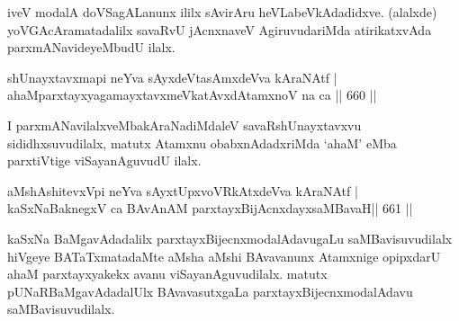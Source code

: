 \begin{artha}
iveV modalA doVSagALanunx ililx sAvirAru heVLabeVkAdadidxve. (alalxde) yoVGAcAramatadalilx savaRvU jAcnxnaveV AgiruvudariMda atirikatxvAda parxmANavideyeMbudU ilalx.
\end{artha}


\begin{shl}
shUnayxtavxmapi neYva sAyxdeVtasAmxdeVva kAraNAtf | \\
ahaMparxtayxyagamayxtavx\footnotemark[1]meVkatAvxdAtamxnoV na ca \hfill||  660 ||  
\end{shl}


\begin{artha}
I parxmANavilalxveMbakAraNadiMdaleV savaRshUnayxtavxvu sididhxsuvudilalx, matutx Atamxnu obabxnAdadxriMda `ahaM' eMba parxtiVtige viSayanAguvudU ilalx.
\end{artha}

\begin{shl}
aMshAshitevxV\s pi neYva sAyxtUpxvoVRkAtxdeVva kAraNAtf | \\
kaSxNaBaknegxV ca BAvAnAM parxtayxBijAcnxdayxsaMBavaH\hfill ||  661 ||  
\end{shl}

\begin{artha}
kaSxNa BaMgavAdadalilx parxtayxBijecnxmodalAdavugaLu saMBavisuvudilalx hiVgeye BATaTxmatadaMte aMsha aMshi BAvavanunx Atamxnige opipxdarU ahaM parxtayxyakekx avanu viSayanAguvudilalx. matutx pUNaRBaMgavAdadalUlx BAvavasutxgaLa parxtayxBijecnxmodalAdavu saMBavisuvudilalx.
\end{artha}

